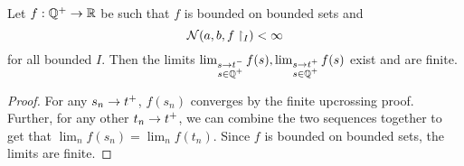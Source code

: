 \documentclass{article}
\begin{document}
\begin{nlemma}
  Let $f : \mathbb Q^+ \rightarrow \mathbb R$ be such that $f$ is bounded on bounded sets and
  $$\mathcal N(a, b, f\restriction_I) < \infty$$
  for all bounded $I$. Then the limits $\lim_{\substack{s \rightarrow t^- \\ s \in \mathbb Q^+}} f(s), \lim_{\substack{s \rightarrow t^+ \\ s \in \mathbb Q^+}} f(s)$ exist and are finite.
\end{nlemma}
\begin{proof}
  For any $s_n \rightarrow t^+$, $f(s_n)$ converges by the finite upcrossing proof. Further, for any other $t_n \rightarrow t^+$, we can combine the two sequences together to get that $\lim_n f(s_n) = \lim_n f(t_n)$. Since $f$ is bounded on bounded sets, the limits are finite.
\end{proof}

\newlec
\end{document}
